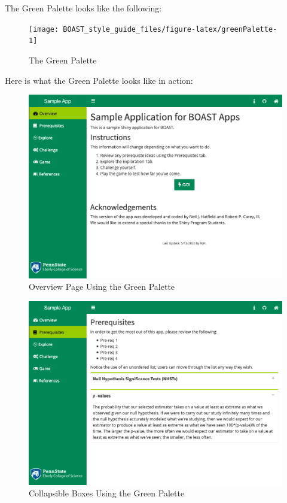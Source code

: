 \documentclass[
]{book}
\begin{document}
The Green Palette looks like the following:

\begin{figure}

{\centering \texttt{[image: BOAST\_style\_guide\_files/figure-latex/greenPalette-1]} 

}

\caption{The Green Palette}\label{fig:greenPalette}
\end{figure}

Here is what the Green Palette looks like in action:

\begin{figure}

{\centering \includegraphics[width=14in]{images/colorThemes/greenOverview} 

}

\caption{Overview Page Using the Green Palette}\label{fig:greenAction1}
\end{figure}

\begin{figure}

{\centering \includegraphics[width=14in]{images/colorThemes/greenCollapse} 

}

\caption{Collapsible Boxes Using the Green Palette}\label{fig:greenAction2}
\end{figure}
\end{document}
